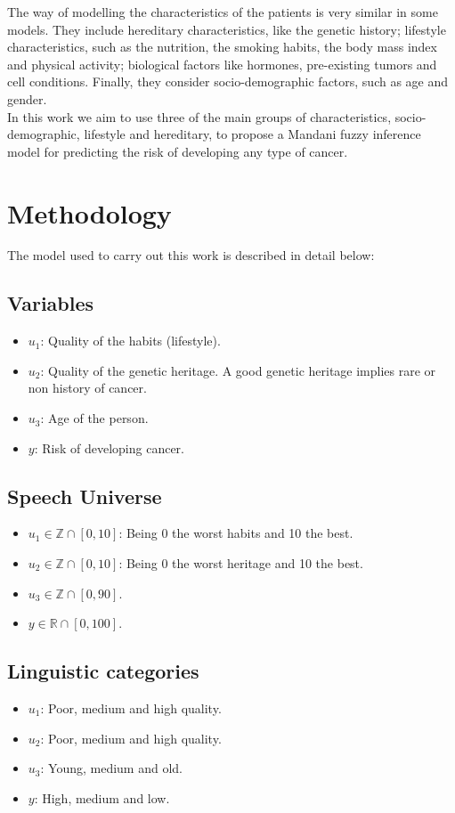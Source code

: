 \documentclass[conference]{IEEEtran}
\begin{document}
The way of modelling the characteristics of the patients is very similar in some models. They include hereditary characteristics, like the genetic history; lifestyle characteristics, such as the nutrition, the smoking habits, the body mass index and physical activity; biological factors like hormones, pre-existing tumors and cell conditions. Finally, they consider socio-demographic factors, such as age and gender. \\

In this work we aim to use three of the main groups of characteristics, socio-demographic, lifestyle and hereditary, to propose a Mandani fuzzy inference model for predicting the risk of developing any type of cancer.

\section{Methodology}
The model used to carry out this work is described in detail below:
\subsection{Variables}
\begin{itemize}
  \item $u_1$: Quality of the habits (lifestyle).
  \item $u_2$: Quality of the genetic heritage. A good genetic heritage implies rare or non history of cancer.
  \item $u_3$: Age of the person.
  \item $y$: Risk of developing cancer.
\end{itemize}
\subsection{Speech Universe}
\begin{itemize}
  \item $u_1 \in \mathbb{Z} \cap [0,10]$: Being 0 the worst habits and 10 the best.
  \item $u_2  \in \mathbb{Z} \cap [0,10]$: Being 0 the worst heritage and 10 the best.
  \item $u_3  \in \mathbb{Z} \cap [0,90]$.
  \item $y  \in \mathbb{R} \cap [0,100]$.
\end{itemize}
\subsection{Linguistic categories}
\begin{itemize}
  \item $u_1$: Poor, medium and high quality.
  \item $u_2$: Poor, medium and high quality.
  \item $u_3$: Young, medium and old.
  \item $y$: High, medium and low.
\end{itemize}
\end{document}
